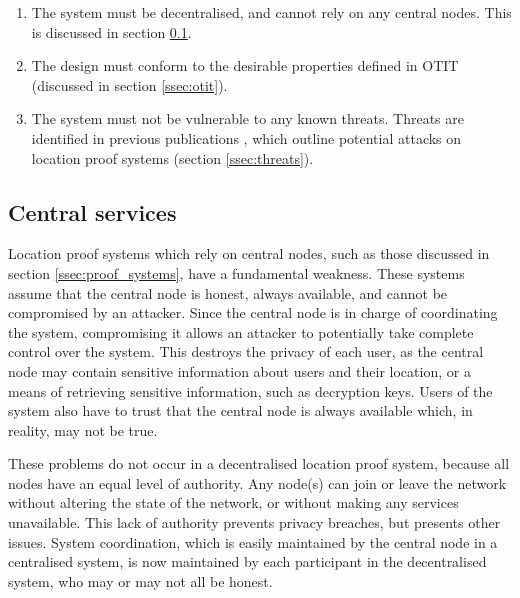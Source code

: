 \begin{enumerate}
	\item The system must be decentralised, and cannot rely on any central nodes. This is discussed in section \ref{ssec:centralised}.
	\item The design must conform to the desirable properties defined in OTIT (discussed in section \ref{ssec:otit}).
	\item The system must not be vulnerable to any known threats. Threats are identified in previous publications \cite{luo,khan}, which outline potential attacks on location proof systems (section \ref{ssec:threats}).
\end{enumerate}

\subsection{Central services} \label{ssec:centralised}
Location proof systems which rely on central nodes, such as those discussed in section \ref{ssec:proof_systems}, have a fundamental weakness. These systems assume that the central node is honest, always available, and cannot be compromised by an attacker. Since the central node is in charge of coordinating the system, compromising it allows an attacker to potentially take complete control over the system. This destroys the privacy of each user, as the central node may contain sensitive information about users and their location, or a means of retrieving sensitive information, such as decryption keys. Users of the system also have to trust that the central node is always available which, in reality, may not be true.

These problems do not occur in a decentralised location proof system, because all nodes have an equal level of authority. Any node(s) can join or leave the network without altering the state of the network, or without making any services unavailable. This lack of authority prevents privacy breaches, but presents other issues. System coordination, which is easily maintained by the central node in a centralised system, is now maintained by each participant in the decentralised system, who may or may not all be honest.


